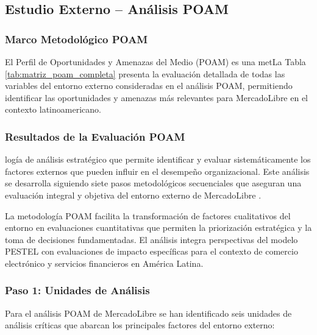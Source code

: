 \subsection{Estudio Externo -- Análisis POAM}
\label{sec:estudio_externo}

\subsubsection{Marco Metodológico POAM}

El Perfil de Oportunidades y Amenazas del Medio (POAM) es una metLa Tabla \ref{tab:matriz_poam_completa} presenta la evaluación detallada de todas las variables del entorno externo consideradas en el análisis POAM, permitiendo identificar las oportunidades y amenazas más relevantes para MercadoLibre en el contexto latinoamericano.

\subsubsection{Resultados de la Evaluación POAM}logía de análisis estratégico que permite identificar y evaluar sistemáticamente los factores externos que pueden influir en el desempeño organizacional. Este análisis se desarrolla siguiendo siete pasos metodológicos secuenciales que aseguran una evaluación integral y objetiva del entorno externo de MercadoLibre \autocite{david2017}.

La metodología POAM facilita la transformación de factores cualitativos del entorno en evaluaciones cuantitativas que permiten la priorización estratégica y la toma de decisiones fundamentadas. El análisis integra perspectivas del modelo PESTEL con evaluaciones de impacto específicas para el contexto de comercio electrónico y servicios financieros en América Latina.

\subsubsection{Paso 1: Unidades de Análisis}

Para el análisis POAM de MercadoLibre se han identificado seis unidades de análisis críticas que abarcan los principales factores del entorno externo:

